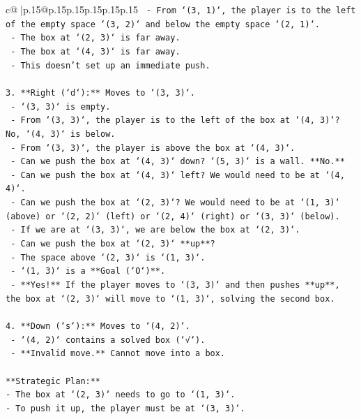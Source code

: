 \documentclass{article}
\begin{document}
{\begin{supertabular}{c@{$\;$}|p{.15\linewidth}@{}p{.15\linewidth}p{.15\linewidth}p{.15\linewidth}p{.15\linewidth}p{.15\linewidth}}
{{{\texttt{    {-} From `(3, 1)`, the player is to the left of the empty space `(3, 2)` and below the empty space `(2, 1)`.} \\
\texttt{    {-} The box at `(2, 3)` is far away.} \\
\texttt{    {-} The box at `(4, 3)` is far away.} \\
\texttt{    {-} This doesn't set up an immediate push.} \\
\\ 
\texttt{3.  **Right (`d`):** Moves to `(3, 3)`.} \\
\texttt{    {-} `(3, 3)` is empty.} \\
\texttt{    {-} From `(3, 3)`, the player is to the left of the box at `(4, 3)`? No, `(4, 3)` is below.} \\
\texttt{    {-} From `(3, 3)`, the player is above the box at `(4, 3)`.} \\
\texttt{    {-} Can we push the box at `(4, 3)` down? `(5, 3)` is a wall. **No.**} \\
\texttt{    {-} Can we push the box at `(4, 3)` left? We would need to be at `(4, 4)`.} \\
\texttt{    {-} Can we push the box at `(2, 3)`? We would need to be at `(1, 3)` (above) or `(2, 2)` (left) or `(2, 4)` (right) or `(3, 3)` (below).} \\
\texttt{    {-} If we are at `(3, 3)`, we are below the box at `(2, 3)`.} \\
\texttt{    {-} Can we push the box at `(2, 3)` **up**?} \\
\texttt{        {-} The space above `(2, 3)` is `(1, 3)`.} \\
\texttt{        {-} `(1, 3)` is a **Goal (`O`)**.} \\
\texttt{        {-} **Yes!** If the player moves to `(3, 3)` and then pushes **up**, the box at `(2, 3)` will move to `(1, 3)`, solving the second box.} \\
\\ 
\texttt{4.  **Down (`s`):** Moves to `(4, 2)`.} \\
\texttt{    {-} `(4, 2)` contains a solved box (`√`).} \\
\texttt{    {-} **Invalid move.** Cannot move into a box.} \\
\\ 
\texttt{**Strategic Plan:**} \\
\texttt{{-} The box at `(2, 3)` needs to go to `(1, 3)`.} \\
\texttt{{-} To push it up, the player must be at `(3, 3)`.} \\
}}}
\end{supertabular}}
\end{document}
